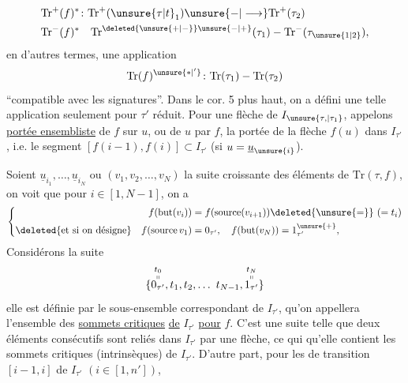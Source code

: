 \[
\begin{aligned}
\mathrm{Tr}^+(f)^*&\colon\mathrm{Tr}^+(\unsure{\tau|t}_1)\unsure{\mathbin{-}|\longrightarrow}\mathrm{Tr}^+(\tau_2)\\
\mathrm{Tr}^-(f)^*&\quad\mathrm{Tr}^{\deleted{\unsure{+|-}}\unsure{-|+}}(\tau_1)\mathbin{-}\mathrm{Tr}^-(\tau_{\unsure{1|2}}),
\end{aligned}
\]
en d'autres termes, une application
\[
 \mathrm{Tr}(f)^{\unsure{*|'}}\colon\mathrm{Tr}(\tau_1)\mathbin{-}\mathrm{Tr}(\tau_2)
\]
``compatible avec les signatures''. Dans le cor. 5
plus haut, on a défini une telle application seulement pour $\tau'$ réduit.
Pour une flèche 
de $I_{\unsure{\tau,|\tau_1}}$,  appelons \uline{portée ensembliste} de
$f$ sur $u$, ou de $u$ par $f$, la portée  de
la flèche $f(u)$ dans $I_{\tau'}$, i.e. 
le segment $[f(i-1),f(i)]\subset I_{\tau'}$ (si $u=\underline{u}_{\unsure{i}}$).

Soient $\underline{u}_{i_1},\ldots,\underline{u}_{i_N}$ ou $(v_1,v_2,\ldots,v_N)$
la suite croissante des éléments de $\mathrm{Tr}(\tau,f)$,
on voit  que pour  $i\in[1,N-1]$, on a
\[
\left\{\begin{aligned}
 f(\operatorname{but}(v_i))&=f(\operatorname{source}(v_{i+1}))\deleted{\unsure{=}}\ ( = t_i)\\
 \deleted{\text{et si on désigne}}\quad f(\operatorname{source}v_1)&=0_{\tau'},\quad f(\operatorname{but}(v_N))=1_{\tau'}^{\unsure{+}},
\end{aligned}\right.
\]
Considérons la suite
\[
\{\overset{\substack{t_0\\\shortparallel}}{0_{\tau'}},t_1,t_2,\ldots\ t_{N-1},\overset{\substack{t_N\\\shortparallel}}{1_{\tau'}}\}
\]
elle est définie par le sous-ensemble correspondant de $I_{\tau'}$, qu'on appellera l'ensemble des
\uline{sommets critiques} \uline{de} $I_{\tau'}$ \uline{pour} $f$.  C'est
une suite  telle que deux éléments consécutifs
sont reliés dans $I_{\tau'}$ par une flèche, ce qui 
 qu'elle contient les sommets critiques (intrinsèques)
de $I_{\tau'}$.  D'autre part, pour les 
de transition $[i-1,i]$ de $I_{\tau'}$  $(i\in[1,n'])$,
